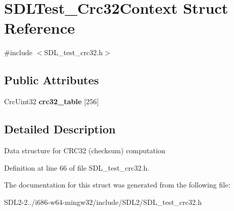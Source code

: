 \hypertarget{structSDLTest__Crc32Context}{\section{S\+D\+L\+Test\+\_\+\+Crc32\+Context Struct Reference}
\label{structSDLTest__Crc32Context}
}


{\ttfamily \#include $<$S\+D\+L\+\_\+test\+\_\+crc32.\+h$>$}

\subsection*{Public Attributes}
\begin{DoxyCompactItemize}
\item 
\hypertarget{structSDLTest__Crc32Context_a1b58f9be021e35a37224c970089906ff}{Crc\+Uint32 {\bfseries crc32\+\_\+table} \mbox{[}256\mbox{]}}\label{structSDLTest__Crc32Context_a1b58f9be021e35a37224c970089906ff}

\end{DoxyCompactItemize}


\subsection{Detailed Description}
Data structure for C\+R\+C32 (checksum) computation 

Definition at line 66 of file S\+D\+L\+\_\+test\+\_\+crc32.\+h.



The documentation for this struct was generated from the following file\+:\begin{DoxyCompactItemize}
\item 
S\+D\+L2-\/2../i686-\/w64-\/mingw32/include/\+S\+D\+L2/S\+D\+L\+\_\+test\+\_\+crc32.\+h\end{DoxyCompactItemize}
